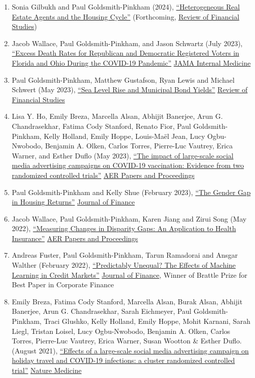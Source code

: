 \documentclass[letterpaper]{article}
\begin{document}
\begin{enumerate}
  \item Sonia Gilbukh and Paul Goldsmith-Pinkham (2024), \href{http://paulgp.github.io/papers/Heterogeneous_Real_Estate_Agents_and_the_Housing_Cycle.pdf}{``Heterogeneous Real Estate Agents and the Housing Cycle''} (Forthcoming, \ul{Review of Financial Studies})
\item Jacob Wallace, Paul Goldsmith-Pinkham, and Jason Schwartz (July 2023), \href{https://jamanetwork.com/journals/jamainternalmedicine/fullarticle/2807617}{``Excess Death Rates for Republican and Democratic Registered Voters in Florida and Ohio During the COVID-19 Pandemic''} \ul{JAMA Internal Medicine}
\item Paul Goldsmith-Pinkham, Matthew Gustafson, Ryan Lewis and Michael Schwert (May 2023), \href{http://paulgp.github.io/papers/ggls_munis.pdf}{``Sea Level Rise and Municipal Bond Yields''} \ul{Review of Financial Studies}
\item Lisa Y. Ho, Emily Breza, Marcella Alsan, Abhijit Banerjee, Arun G. Chandrasekhar, Fatima Cody Stanford, Renato Fior, Paul Goldsmith-Pinkham, Kelly Holland, Emily Hoppe, Louis-Maël Jean, Lucy Ogbu-Nwobodo, Benjamin A. Olken, Carlos Torres, Pierre-Luc Vautrey, Erica Warner, and Esther Duflo (May 2023), \href{https://paulgp.github.io/papers/submission_manuscript_appendix_social_media_covid_vaccines.pdf}{``The impact of large-scale social media advertising campaigns on COVID-19 vaccination: Evidence from two randomized controlled trials''} \ul{AER Papers and Proceedings}
\item Paul Goldsmith-Pinkham and Kelly Shue (February 2023), \href{https://paulgp.github.io/papers/Gender_Gap_in_Housing_Returns.pdf}{``The Gender Gap in Housing Returns''} \ul{Journal of Finance}
\item  Jacob Wallace, Paul Goldsmith-Pinkham, Karen Jiang and Zirui Song (May 2022), \href{https://paulgp.github.io/papers/aerpp_medicare.pdf}{``Measuring Changes in Disparity Gaps: An Application to Health Insurance''} \ul{AER Papers and Proceedings}
\item Andreas Fuster, Paul Goldsmith-Pinkham, Tarun Ramadorai and Ansgar Walther (February 2022), \href{https://papers.ssrn.com/sol3/papers.cfm?abstract_id=3072038}{``Predictably Unequal? The Effects of Machine Learning in Credit Markets''} \ul{Journal of Finance}, Winner of Brattle Prize for Best Paper in Corporate Finance
\item Emily Breza, Fatima Cody Stanford, Marcella Alsan, Burak Alsan, Abhijit Banerjee, Arun G. Chandrasekhar, Sarah Eichmeyer, Paul Goldsmith-Pinkham, Traci Glushko, Kelly Holland, Emily Hoppe, Mohit Karnani, Sarah Liegl, Tristan Loisel, Lucy Ogbu-Nwobodo, Benjamin A. Olken, Carlos Torres, Pierre-Luc Vautrey, Erica Warner, Susan Wootton \& Esther Duflo. (August 2021), \href{https://www.nature.com/articles/s41591-021-01487-3.pdf}{``Effects of a large-scale social media advertising campaign on holiday travel and COVID-19 infections: a cluster randomized controlled trial''} \ul{Nature Medicine}

\end{enumerate}
\end{document}
